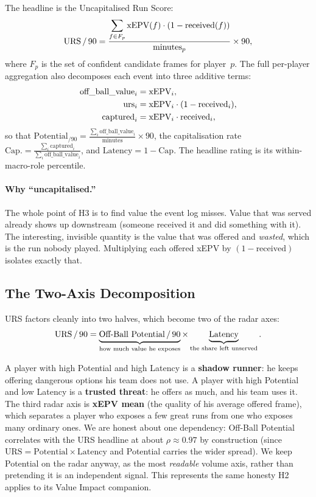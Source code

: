 \documentclass[12pt,a4paper]{article}
\begin{document}
The headline is the Uncapitalised Run Score:
\begin{equation}\label{eq:urs}
    \text{URS\,/\,90} = \frac{\displaystyle\sum_{f \in F_p} \text{xEPV}(f) \cdot (1 - \text{received}(f))}{\text{minutes}_p} \times 90,
\end{equation}
where $F_p$ is the set of confident candidate frames for player~$p$.
The full per-player aggregation also decomposes each event into three additive terms:
\begin{align}
    \text{off\_ball\_value}_i &= \text{xEPV}_i, \notag\\
    \text{urs}_i &= \text{xEPV}_i \cdot (1 - \text{received}_i), \notag\\
    \text{captured}_i &= \text{xEPV}_i \cdot \text{received}_i, \notag
\end{align}
so that $\text{Potential}_{/90} = \frac{\sum_i \text{off\_ball\_value}_i}{\text{minutes}} \times 90$, the capitalisation rate $\text{Cap.} = \frac{\sum_i \text{captured}_i}{\sum_i \text{off\_ball\_value}_i}$, and $\text{Latency} = 1 - \text{Cap.}$
The headline rating is its within-macro-role percentile.

\paragraph{Why ``uncapitalised.''}
The whole point of H3 is to find value the event log misses.
Value that was served already shows up downstream (someone received it and did something with it).
The interesting, invisible quantity is the value that was offered and \emph{wasted}, which is the run nobody played.
Multiplying each offered xEPV by $(1 - \text{received})$ isolates exactly that.

\subsection{The Two-Axis Decomposition}\label{sec:urs-decomp}

URS factors cleanly into two halves, which become two of the radar axes:
\begin{equation}\label{eq:urs-split}
    \text{URS\,/\,90} = \underbrace{\text{Off-Ball Potential\,/\,90}}_{\text{how much value he exposes}} \times \underbrace{\text{Latency}}_{\text{the share left unserved}}.
\end{equation}

A player with high Potential and high Latency is a \textbf{shadow runner}: he keeps offering dangerous options his team does not use.
A player with high Potential and low Latency is a \textbf{trusted threat}: he offers as much, and his team uses it.
The third radar axis is \textbf{xEPV mean} (the quality of his average offered frame), which separates a player who exposes a few great runs from one who exposes many ordinary ones.
We are honest about one dependency: Off-Ball Potential correlates with the URS headline at about $\rho \approx 0.97$ by construction (since $\text{URS} = \text{Potential} \times \text{Latency}$ and Potential carries the wider spread). We keep Potential on the radar anyway, as the most \emph{readable} volume axis, rather than pretending it is an independent signal. This represents the same honesty H2 applies to its Value Impact companion.
\end{document}
